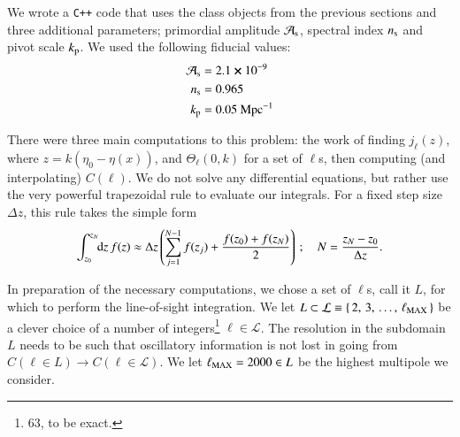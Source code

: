 




We wrote a \verb|C++| code that uses the class objects from the previous sections and three additional parameters; primordial amplitude $\mathcal{A}_\mathrm{s}$, spectral index $n_\mathrm{s}$ and pivot scale $k_\mathrm{p}$. We used the following fiducial values:
\begin{equation}
\begin{split}
    \mathcal{A}_\mathrm{s}  &=  2.1\cross 10^{-9}   \\
    n_\mathrm{s}            &=  0.965               \\
    k_\mathrm{p}            &=  0.05~\mathrm{Mpc^{-1}}
\end{split}
\end{equation}


There were three main computations to this problem: the work of finding $j_\ell(z)$, where $z= k(\eta_0-\eta(x))$, and $\Theta_\ell(0,k)$ for a set of $\ell$s, then computing (and interpolating) $C(\ell)$.
We do not solve any differential equations, but rather use the very powerful trapezoidal rule to evaluate our integrals. For a fixed step size $\Delta z$, this rule takes the simple form
\begin{equation}\label{mil4:imp:eq:trapezoidal_uniform}
    \int_{z_0}^{z_N} \!\!\mathop{}\!\mathrm{d} {z}\, f(z) \approx \Delta z \left( \sum_{j=1}^{N-1}f(z_j) + \frac{f(z_0) + f(z_{N})}{2} \right)\,; \quad N= \frac{z_N-z_0}{\Delta z}.
\end{equation}


In preparation of the necessary computations, we chose a set of $\ell$s, call it $L$, for which to perform the line-of-sight integration. We let $L\subset \mathcal{L}\equiv \{\,2,\,3,\, \dots,\,  \ell_\mathrm{MAX}\,\}$ be a clever choice of a number of integers\footnote{63, to be exact.} $\ell\in \mathcal{L}$. The resolution in the subdomain $L$ needs to be such that oscillatory information is not lost in going from $C(\ell\in L)\to C(\ell\in\mathcal{L})$. We let $\ell_\mathrm{MAX}=2000 \in L$ be the highest multipole we consider. 

